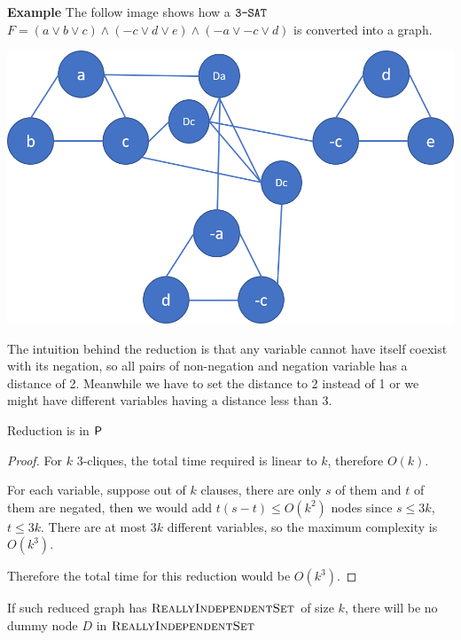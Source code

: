 \textbf{Example} The follow image shows how a $\tSAT$ $F = (a \vee b \vee c) \wedge (-c \vee d \vee e) \wedge (-a\vee -c \vee d)$ is converted into a graph.

\includegraphics[width = \textwidth]{Ex1.png}

The intuition behind the reduction is that any variable cannot have itself coexist with its negation, so all pairs of non-negation and negation variable has a distance of 2. 
Meanwhile we have to set the distance to 2 instead of 1 or we might have different variables having a distance less than 3.

\begin{theorem}
    Reduction is in $\P$
\end{theorem}

\begin{proof}
    For $k$ 3-cliques, the total time required is linear to $k$, therefore $O(k)$.

    For each variable, suppose out of $k$ clauses, there are only $s$ of them and $t$ of them are negated, then we would add $t(s-t) \leq O(k^2)$ nodes since $s \leq 3k$, $t \leq 3k$. 
    There are at most $3k$ different variables, so the maximum complexity is $O(k^3)$.

    Therefore the total time for this reduction would be $O(k^3)$.
\end{proof}

\begin{lemma}
    If such reduced graph has $\RIS$ of size $k$, there will be no dummy node $D$ in $\RIS$
\end{lemma}


